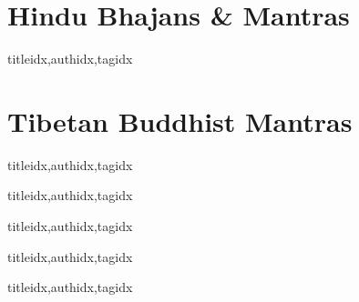 \documentclass[twoside,10pt]{book}
\begin{document}
    \section{Hindu Bhajans \& Mantras}
      \begin{songs}{titleidx,authidx,tagidx}
        \setcounter{songnum}{100}
        
      \end{songs}
     \scleardpage
    \section{Tibetan Buddhist Mantras}
      \begin{songs}{titleidx,authidx,tagidx}
        \setcounter{songnum}{150}
        
      \end{songs}

  \clearpage\scleardpage
    \begin{songs}{titleidx,authidx,tagidx}
      \setcounter{songnum}{200}
      
    \end{songs}

  \clearpage\scleardpage
    \begin{songs}{titleidx,authidx,tagidx}
      \setcounter{songnum}{300}
      
    \end{songs}

  \clearpage\scleardpage
    \begin{songs}{titleidx,authidx,tagidx}
      \setcounter{songnum}{400}
      
    \end{songs}

  \clearpage\scleardpage
    \begin{songs}{titleidx,authidx,tagidx}
      \setcounter{songnum}{500}
      
    \end{songs}
\end{document}
